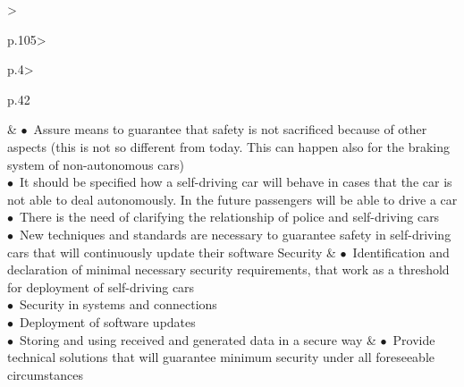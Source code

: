 \begin{table}[t]
\begin{small}
\begin{supertabular}{%
		>{\raggedright}p{.105\textwidth}>{\raggedright}p{.4\textwidth}>{\raggedright}p{.42\textwidth}}
 			& \vspace{.1cm}
					\noindent $\bullet$~Assure means to guarantee that safety is not sacrificed because of other aspects (this is not so different from today. This can happen also for the braking system of non-autonomous cars)\\
					\noindent $\bullet$~It should be specified how a self-driving car will behave in cases that the car is not able to deal autonomously. In the future passengers will be able to drive a car \\
					\noindent $\bullet$~There is the need of clarifying the relationship of police and self-driving cars\\
					\noindent $\bullet$~New techniques and standards are necessary to guarantee safety in self-driving cars that will continuously update their software \vspace{.2cm}
 			 \tabularnewline \hline %
			\vspace{.1cm}Security & \vspace{.1cm}
					\noindent $\bullet$~Identification and declaration of minimal necessary security requirements, that work as a threshold for deployment of self-driving cars\\ %
					\noindent $\bullet$~Security in systems and connections\\ %
					\noindent $\bullet$~Deployment of software updates \\%
					\noindent $\bullet$~Storing and using received and generated data in a secure way %
			& \vspace{.1cm}
					\noindent $\bullet$~Provide technical solutions that will guarantee minimum security under all foreseeable circumstances\\

\end{supertabular}
\end{small}
\end{table}
